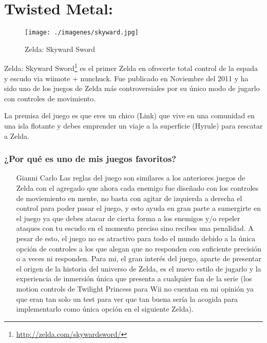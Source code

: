 \section{Twisted Metal: }

\begin{figure}[htbp]
\begin{center}
\texttt{[image: ./imagenes/skyward.jpg]}
\caption{Zelda: Skyward Sword}
\label{Zelda: Skyward Sword}
\end{center}
\end{figure}
Zelda: Skyward Sword\footnote{\url{http://zelda.com/skywardsword/}} es el primer Zelda en ofrecerte total control de la espada y escudo via wiimote + nunchuck. Fue publicado en Noviembre del 2011 y ha sido uno de los juegos de Zelda más controversiales por su único modo de jugarlo con controles de movimiento.

La premisa del juego es que eres un chico (Link) que vive en una comunidad en una isla flotante y debes emprender un viaje a la superficie (Hyrule) para rescatar a Zelda.

\subsubsection{¿Por qué es uno de mis juegos favoritos?}
\begin{itemize}
\item[Gianni Carlo] Las reglas del juego son similares a los anteriores juegos de Zelda con el agregado que ahora cada enemigo fue diseñado con los controles de moviemiento en mente, no basta con agitar de izquierda a derecha el control para poder pasar el juego, y esto ayuda en gran parte a sumergirte en el juego ya que debes atacar de cierta forma a los enemigos y/o repeler ataques con tu escudo en el momento preciso sino recibes una penalidad. A pesar de esto, el juego no es atractivo para todo el mundo debido a la única opción de controles a los que alegan que no responden con suficiente precisión o a veces ni responden. Para mi, el gran interés del juego, aparte de presentar el origen de la historia del universo de Zelda, es el nuevo estilo de jugarlo y la experiencia de inmersión única que presenta a cualquier fan de la serie (los motion controls de Twilight Princess para Wii no cuentan en mi opinión ya que eran tan solo un test para ver que tan buena sería la acogida para implementarlo como única opción en el siguiente Zelda).
\end{itemize}